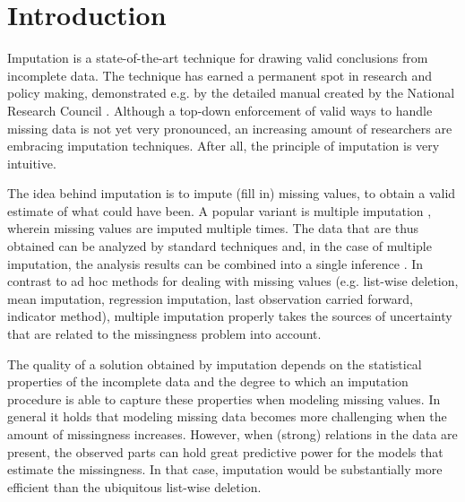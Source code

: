 \documentclass[bimj,fleqn]{w-art}
\theoremstyle{plain}
\theoremstyle{definition}
\begin{document}



\section{Introduction}

Imputation is a state-of-the-art technique for drawing valid conclusions from incomplete data. The technique has earned a permanent spot in research and policy making, demonstrated e.g. by the detailed manual created by the National Research Council \citep*{little2012prevention}. Although a top-down enforcement of valid ways to handle missing data is not yet very pronounced, an increasing amount of researchers are embracing imputation techniques. After all, the principle of imputation is very intuitive.

The idea behind imputation is to impute (fill in) missing values, to obtain a valid estimate of what could have been. A popular variant is multiple imputation \citep{rubi76}, wherein missing values are imputed multiple times. The data that are thus obtained can be analyzed by standard techniques and, in the case of multiple imputation, the analysis results can be combined into a single inference \citep[using Rubin's rules][]{rubi87}. In contrast to ad hoc methods for dealing with missing values (e.g. list-wise deletion, mean imputation, regression imputation, last observation carried forward, indicator method), multiple imputation properly takes the sources of uncertainty that are related to the missingness problem into account. 

The quality of a solution obtained by imputation depends on the statistical properties of the incomplete data and the degree to which an imputation procedure is able to capture these properties when modeling missing values. In general it holds that modeling missing data becomes more challenging when the amount of missingness increases. However, when (strong) relations in the data are present, the observed parts can hold great predictive power for the models that estimate the missingness. In that case,  imputation would be substantially more efficient than the ubiquitous list-wise deletion.
\end{document}
